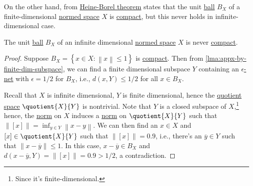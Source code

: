 On the other hand, from \hyperref[thm:Heine-Borel]{Heine-Borel theorem} states that the unit \hyperref[def:ball]{ball} \(B_X\) of a finite-dimensional \hyperref[def:normed-vector-space]{normed space} \(X\) is \hyperref[def:compact]{compact}, but this never holds in infinite-dimensional case.

\begin{theorem}\label{thm:Riesz}
	The unit \hyperref[def:ball]{ball} \(B_X\) of an infinite dimensional \hyperref[def:normed-vector-space]{normed space} \(X\) is never \hyperref[def:compact]{compact}.
\end{theorem}
\begin{proof}
	Suppose \(B_X= \left\{ x\in X\colon \left\lVert x\right\rVert \leq 1 \right\} \) is \hyperref[def:compact]{compact}. Then from \autoref{lma:appx-by-finite-dim-subspace}, we can find a finite dimensional subspace \(Y\) containing an \hyperref[def:eps-net]{\(\epsilon\)-net} with \(\epsilon = 1 / 2\)  for \(B_X\), i.e., \(d(x, Y) \leq 1 / 2\) for all \(x\in B_X\).

	Recall that \(X\) is infinite dimensional, \(Y\) is finite dimensional, hence the \hyperref[def:quotient-space]{quotient space} \(\quotient{X}{Y} \) is nontrivial. Note that \(Y\) is a closed subspace of \(X\),\footnote{Since it's finite-dimensional.} hence, the \hyperref[def:norm]{norm} on \(X\) induces a \hyperref[def:norm]{norm} on \(\quotient{X}{Y}\) such that \(\left\lVert [x]\right\rVert = \inf _{y\in Y} \left\lVert x - y\right\rVert\). We can then find an \(x\in X\) and \([x]\in \quotient{X}{Y} \) such that \(\left\lVert [x]\right\rVert = 0.9\), i.e., there's an \(\overline{y} \in Y\) such that \(\left\lVert x - \overline{y} \right\rVert \leq 1\). In this case, \(x - \overline{y} \in B_X\) and \(d(x-\overline{y} , Y) = \lVert [x] \rVert = 0.9 > 1 / 2\), a contradiction.
\end{proof}